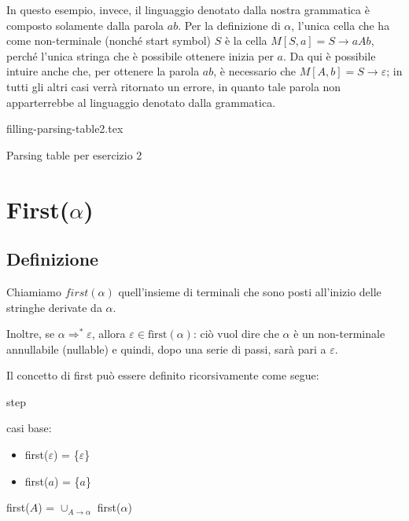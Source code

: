\documentclass[class=book, crop=false, oneside, 12pt]{standalone}
\begin{document}
In questo esempio, invece, il linguaggio denotato dalla nostra grammatica è composto solamente dalla parola \(ab\). Per la definizione di \(\alpha\), l'unica cella che ha come non-terminale (nonché start symbol) \(S\) è la cella \(M[S, a] = S \rightarrow aAb\), perché l'unica stringa che è possibile ottenere inizia per \(a\). Da qui è possibile intuire anche che, per ottenere la parola \(ab\), è necessario che \(M[A, b] = S \rightarrow \varepsilon\); in tutti gli altri casi verrà ritornato un errore, in quanto tale parola non apparterrebbe al linguaggio denotato dalla grammatica. 

\begin{table}[H]
	\centering
	{filling-parsing-table2.tex}
    \caption{Parsing table per esercizio 2}
    \label{filling-parsing-table2}
\end{table}

\section{First(\(\alpha\))}
\subsection{Definizione}
\begin{definition}
    Chiamiamo \(first(\alpha)\) quell'insieme di terminali che sono posti all'inizio delle stringhe derivate da \(\alpha\).
    
    Inoltre, se \(\alpha \Rightarrow^* \varepsilon\), allora \(\varepsilon \in \textrm{first}(\alpha)\): ciò vuol dire che \(\alpha\) è un non-terminale annullabile (nullable) e quindi, dopo una serie di passi, sarà pari a \(\varepsilon\).
\end{definition}

Il concetto di first può essere definito ricorsivamente come segue:

\begin{labeling}{step}
    \item[base] casi base:
    \begin{itemize}
        \item first(\(\varepsilon\)) = \{\(\varepsilon\)\}
        \item first(\(a\)) = \{\(a\)\}
    \end{itemize}
    \item[step] first(\(A\)) = \(\cup_{A \rightarrow \alpha}\) first(\(\alpha\))
\end{labeling}
\end{document}
